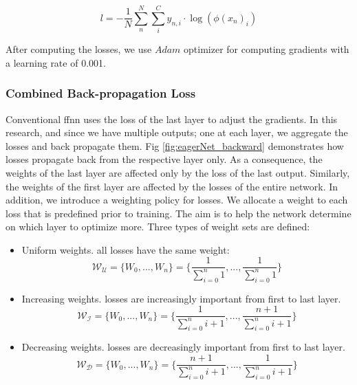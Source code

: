 \documentclass[conference]{IEEEtran}
\begin{document}
\begin{equation}
\label{eq:cceloss}
l = - \frac{1}{N} \sum_{n}^{N} \sum_{i}^{C} y_{n,i} \cdot \log (\phi(x_{n})_{i})
\end{equation}

After computing the losses, we use $Adam$ optimizer \cite{kingma_adam_2017} for computing gradients with a learning rate of 0.001.


\subsubsection{Combined Back-propagation Loss}
Conventional \gls{ffnn} uses the loss of the last layer to adjust the gradients. In this research, and since we have multiple outputs; one at each layer, we aggregate the losses and back propagate them. Fig \ref{fig:eagerNet_backward} demonstrates how losses propagate back from the respective layer only. As a consequence, the weights of the last layer are affected only by the loss of the last output. Similarly, the weights of the first layer are affected by the losses of the entire network. In addition, we introduce a weighting policy for losses. We allocate a weight to each loss that is predefined prior to training. The aim is to help the network determine on which layer to optimize more. Three types of weight sets are defined:
\begin{itemize}
\item Uniform weights. all losses have the same weight:
\begin{equation}
\mathcal{W_U} = \lbrace W_{0}, ..., W_{n} \rbrace = \lbrace \frac{1}{\sum_{i=0}^{n} 1}, ..., \frac{1}{\sum_{i=0}^{n} 1} \rbrace
\end{equation}

\item Increasing weights. losses are increasingly important from first to last layer.
\begin{equation}
\mathcal{W_I} = \lbrace W_{0}, ..., W_{n} \rbrace = \lbrace \frac{1}{\sum_{i=0}^{n} i+1}, ..., \frac{n+1}{\sum_{i=0}^{n} i+1} \rbrace
\end{equation}

\item Decreasing weights. losses are decreasingly important from first to last layer.
\begin{equation}
\mathcal{W_D} = \lbrace W_{0}, ..., W_{n} \rbrace = \lbrace \frac{n+1}{\sum_{i=0}^{n} i+1}, ..., \frac{1}{\sum_{i=0}^{n} i+1} \rbrace
\end{equation}

\end{itemize}
\end{document}
